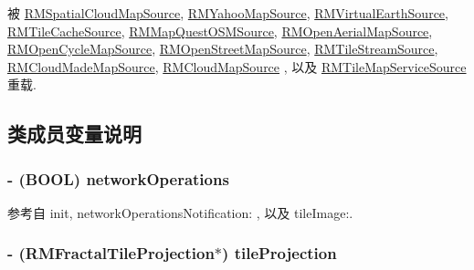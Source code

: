 被 \hyperlink{interface_r_m_spatial_cloud_map_source_acb584cc15f37012168e4a81be5fb1a5d}{R\-M\-Spatial\-Cloud\-Map\-Source}, \hyperlink{interface_r_m_yahoo_map_source_aef91c1e282958b4c0f69e3ca885e28e9}{R\-M\-Yahoo\-Map\-Source}, \hyperlink{interface_r_m_virtual_earth_source_a8b7b461c2e4a8a89d51ca08e6d9d7628}{R\-M\-Virtual\-Earth\-Source}, \hyperlink{interface_r_m_tile_cache_source_a0fc37a76b0161717c4bf0de4a03d5fe0}{R\-M\-Tile\-Cache\-Source}, \hyperlink{interface_r_m_map_quest_o_s_m_source_ac5f1fbdc160544d60e9706b4e8e0c6a5}{R\-M\-Map\-Quest\-O\-S\-M\-Source}, \hyperlink{interface_r_m_open_aerial_map_source_a5da92a4a64ec3e3ecb36068b5264ca3f}{R\-M\-Open\-Aerial\-Map\-Source}, \hyperlink{interface_r_m_open_cycle_map_source_a8f454702038372b215a4cfabdce76022}{R\-M\-Open\-Cycle\-Map\-Source}, \hyperlink{interface_r_m_open_street_map_source_a6bf79a7fd62c28cb11979a7d4bdb65b9}{R\-M\-Open\-Street\-Map\-Source}, \hyperlink{interface_r_m_tile_stream_source_ab121a1455447ad90239e7f4ca78ce9a3}{R\-M\-Tile\-Stream\-Source}, \hyperlink{interface_r_m_cloud_made_map_source_aae477f125ad88298f778b14b079a7bbb}{R\-M\-Cloud\-Made\-Map\-Source}, \hyperlink{interface_r_m_cloud_map_source_a7c4d7bb98a9fee5864622a1c5e342dd8}{R\-M\-Cloud\-Map\-Source} , 以及 \hyperlink{interface_r_m_tile_map_service_source_a80f88caa0b6ea9310552e62714522348}{R\-M\-Tile\-Map\-Service\-Source} 重载.



\subsection{类成员变量说明}
\hypertarget{interface_r_m_abstract_mercator_web_source_ac05e057c8f0e7dc24790b673e136ce75}{
\subsubsection[{network\-Operations}]{\setlength{\rightskip}{0pt plus 5cm}-\/ (B\-O\-O\-L) network\-Operations\hspace{0.3cm}{\ttfamily [protected]}}}\label{interface_r_m_abstract_mercator_web_source_ac05e057c8f0e7dc24790b673e136ce75}


参考自 init, network\-Operations\-Notification\-: , 以及 tile\-Image\-:.

\hypertarget{interface_r_m_abstract_mercator_web_source_abdb12e5197d9fb938a9d68bb0a9c9ae5}{
\subsubsection[{tile\-Projection}]{\setlength{\rightskip}{0pt plus 5cm}-\/ ({\bf R\-M\-Fractal\-Tile\-Projection}$\ast$) tile\-Projection\hspace{0.3cm}{\ttfamily [protected]}}}\label{interface_r_m_abstract_mercator_web_source_abdb12e5197d9fb938a9d68bb0a9c9ae5}


